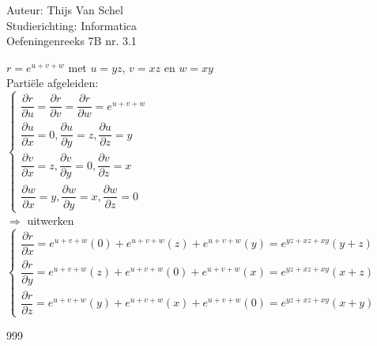 \documentclass[a4paper]{article}
\begin{document}
  
\noindent \large Auteur: Thijs Van Schel \\
\noindent \large Studierichting: Informatica\\
\noindent \large Oefeningenreeks 7B nr. 3.1\\

\medskip

\normalsize

$r = e^{u+v+w}$ met $u = yz$, $v = xz$ en $w = xy$\\

Partiële afgeleiden:\\

$\left\{ 
\begin{array}{l} 
\dfrac{\partial r}{\partial u} = \dfrac{\partial r}{\partial v} = \dfrac{\partial r}{\partial w} = e^{u+v+w} \\ 
\dfrac{\partial u}{\partial x} = 0, \dfrac{\partial u}{\partial y} = z, \dfrac{\partial u}{\partial z} = y \\ 
\dfrac{\partial v}{\partial x} = z, \dfrac{\partial v}{\partial y} = 0, \dfrac{\partial v}{\partial z} = x \\
\dfrac{\partial w}{\partial x} = y, \dfrac{\partial w}{\partial y} = x, \dfrac{\partial w}{\partial z} = 0
\end{array} 
\right.$\\

$\Rightarrow$ uitwerken\\

$\left\{ 
\begin{array}{l} 
\dfrac{\partial r}{\partial x} = e^{u+v+w}(0) + e^{u+v+w}(z) + e^{u+v+w}(y) = e^{yz+xz+xy}(y+z) \\ 
\dfrac{\partial r}{\partial y} = e^{u+v+w}(z) + e^{u+v+w}(0) + e^{u+v+w}(x) = e^{yz+xz+xy}(x+z) \\
\dfrac{\partial r}{\partial z} = e^{u+v+w}(y) + e^{u+v+w}(x) + e^{u+v+w}(0) = e^{yz+xz+xy}(x+y)
\end{array} 
\right.$\\

\begin{thebibliography}{999}
\end{thebibliography}
\end{document}
